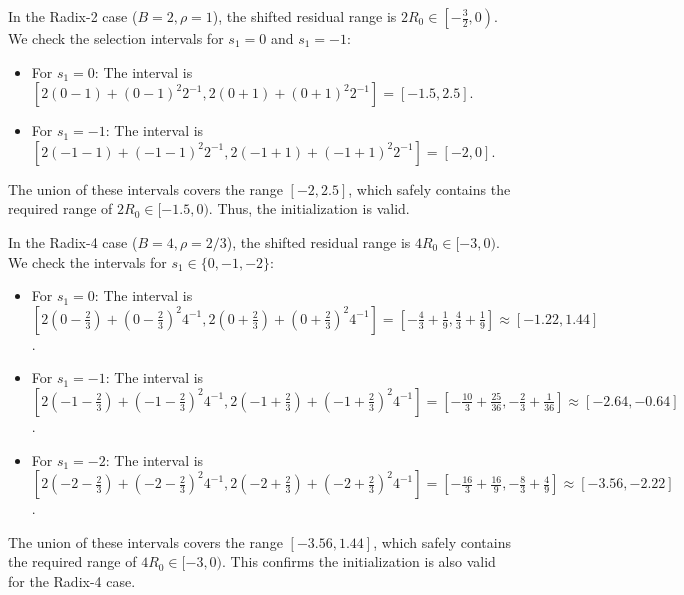 \documentclass{article}
\begin{document}
In the Radix-2 case ($B = 2, \rho = 1$), the shifted residual range is $2 R_0 \in \left[-\frac{3}{2}, 0\right)$.
We check the selection intervals for $s_1 = 0$ and $s_1 = -1$:
\begin{itemize}
    \item For $s_1 = 0$: The interval is $[2(0-1) + (0-1)^2 2^{-1}, 2(0+1) + (0+1)^2 2^{-1}] = [-1.5, 2.5]$.
    \item For $s_1 = -1$: The interval is $[2(-1-1) + (-1-1)^2 2^{-1}, 2(-1+1) + (-1+1)^2 2^{-1}] = [-2, 0]$.
\end{itemize}
The union of these intervals covers the range $[-2, 2.5]$, which safely contains the required range of $2 R_0 \in [-1.5, 0)$.
Thus, the initialization is valid.

In the Radix-4 case ($B = 4, \rho = 2/3$), the shifted residual range is $4 R_0 \in [-3, 0)$.
We check the intervals for $s_1 \in \{0, -1, -2\}$:
\begin{itemize}
    \item For $s_1 = 0$: The interval is $\left[2\left(0-\frac{2}{3}\right) + \left(0-\frac{2}{3}\right)^2 4^{-1}, 2\left(0+\frac{2}{3}\right) + \left(0+\frac{2}{3}\right)^2 4^{-1}\right] = \left[-\frac{4}{3} + \frac{1}{9}, \frac{4}{3} + \frac{1}{9}\right] \approx [-1.22, 1.44]$.
    \item For $s_1 = -1$: The interval is $\left[2\left(-1-\frac{2}{3}\right) + \left(-1-\frac{2}{3}\right)^2 4^{-1}, 2\left(-1+\frac{2}{3}\right) + \left(-1+\frac{2}{3}\right)^2 4^{-1}\right] = \left[-\frac{10}{3} + \frac{25}{36}, -\frac{2}{3} + \frac{1}{36}\right] \approx [-2.64, -0.64]$.
    \item For $s_1 = -2$: The interval is $\left[2\left(-2-\frac{2}{3}\right) + \left(-2-\frac{2}{3}\right)^2 4^{-1}, 2\left(-2+\frac{2}{3}\right) + \left(-2+\frac{2}{3}\right)^2 4^{-1}\right] = \left[-\frac{16}{3} + \frac{16}{9}, -\frac{8}{3} + \frac{4}{9}\right] \approx [-3.56, -2.22]$.
\end{itemize}
The union of these intervals covers the range $[-3.56, 1.44]$, which safely contains the required range of $4 R_0 \in [-3, 0)$.
This confirms the initialization is also valid for the Radix-4 case.
\end{document}
